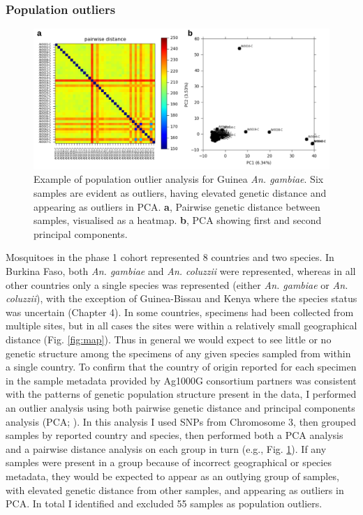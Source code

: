 \documentclass[a4paper,11pt,abstracton,hidelinks]{scrartcl}
\begin{document}
\subsubsection{Population outliers}


\begin{figure}[t!]
\centering
\includegraphics[width=\textwidth]{artwork/chapter3/popout.pdf}
\caption{Example of population outlier analysis for Guinea \textit{An. gambiae}.
%
Six samples are evident as outliers, having elevated genetic distance and appearing as outliers in PCA.
%
\textbf{a}, Pairwise genetic distance between samples, visualised as a heatmap.
%
\textbf{b}, PCA showing first and second principal components.
%
}
%
\label{fig:popout}
\end{figure}


Mosquitoes in the phase 1 cohort represented 8 countries and two species. 
%
In Burkina Faso, both \textit{An. gambiae} and \textit{An. coluzzii} were represented, whereas in all other countries only a single species was represented (either \textit{An. gambiae} or \textit{An. coluzzii}), with the exception of Guinea-Bissau and Kenya where the species status was uncertain (Chapter 4).
%
In some countries, specimens had been collected from multiple sites, but in all cases the sites were within a relatively small geographical distance (Fig. \ref{fig:map}).
%
Thus in general we would expect to see little or no genetic structure among the specimens of any given species sampled from within a single country.
%
To confirm that the country of origin reported for each specimen in the sample metadata provided by Ag1000G consortium partners was consistent with the patterns of genetic population structure present in the data, I performed an outlier analysis using both pairwise genetic distance and principal components analysis (PCA; \cite{Patterson2006}).
%
In this analysis I used SNPs from Chromosome 3, then grouped samples by reported country and species, then performed both a PCA analysis and a pairwise distance analysis on each group in turn (e.g., Fig. \ref{fig:popout}).
%
If any samples were present in a group because of incorrect geographical or species metadata, they would be expected to appear as an outlying group of samples, with elevated genetic distance from other samples, and appearing as outliers in PCA.
%
In total I identified and excluded 55 samples as population outliers.
\end{document}
